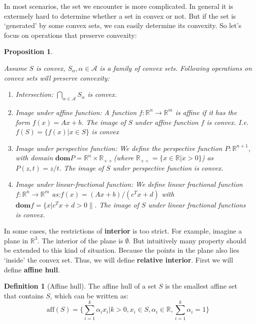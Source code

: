 \documentclass[
]{book}
\newtheorem{proposition}{Proposition}[chapter]
\theoremstyle{definition}
\newtheorem{definition}{Definition}[chapter]
\theoremstyle{definition}
\theoremstyle{definition}
\theoremstyle{definition}
\theoremstyle{remark}
\begin{document}
In most scenarios, the set we encounter is more complicated. In general it is extermely hard to determine whether a set in convex or not. But if the set is `generated' by some convex sets, we can easily determine its convexity. So let's focus on operations that preserve convexity:

\begin{proposition}
\protect\hypertarget{prp:operationpreserveconvexity}{}\label{prp:operationpreserveconvexity}

Assume \(S\) is convex, \(S_\alpha,\alpha\in\mathcal{A}\) is a family of convex sets. Following operations on convex sets will preserve convexity:

\begin{enumerate}
\def\labelenumi{\arabic{enumi}.}
\item
  Intersection: \(\bigcap_{\alpha\in\mathcal{A}}S_\alpha\) is convex.
\item
  Image under affine function: A function \(f:\mathbb{R}^n\to\mathbb{R}^m\) is affine if it has the form \(f(x) = Ax+b\). The image of \(S\) under affine function \(f\) is convex. I.e. \(f(S) = \{f(x)|x\in S\}\) is convex
\item
  Image under perspective function: We define the perspective function \(P:\mathbb{R}^{n+1}\), with domain \(\textbf{dom}P = \mathbb{R}^n\times \mathbb{R}_{++}\)(where \(\mathbb{R}_{++}=\{x\in \mathbb{R}|x>0\}\)) as \(P(z,t) = z/t\). The image of \(S\) under perspective function is convex.
\item
  Image under linear-fractional function: We define linear fractional function \(f:\mathbb{R}^n\to\mathbb{R}^m\) as:\(f(x) = (Ax+b)/(c^Tx+d)\) with \(\textbf{dom}f = \{x|c^Tx+d>0\|\). The image of \(S\) under linear fractional functions is convex.
\end{enumerate}

\end{proposition}

In some cases, the restrictions of \textbf{interior} is too strict. For example, imagine a plane in \(\mathbb{R}^3\). The interior of the plane is \(\emptyset\). But intuitively many property should be extended to this kind of situation. Because the points in the plane also lies `inside' the convex set. Thus, we will define \textbf{relative interior}. First we will define \textbf{affine hull}.

\begin{definition}[Affine hull]
\protect\hypertarget{def:affinehull}{}\label{def:affinehull}The affine hull of a set \(S\) is the smallest affine set that contains \(S\), which can be written as:
\[\text{aff}(S) = \{\sum_{i=1}^k\alpha_ix_i|k>0,x_i\in S,\alpha_i\in\mathbb{R},\sum_{i=1}^k\alpha_i=1\}\]
\end{definition}
\end{document}
